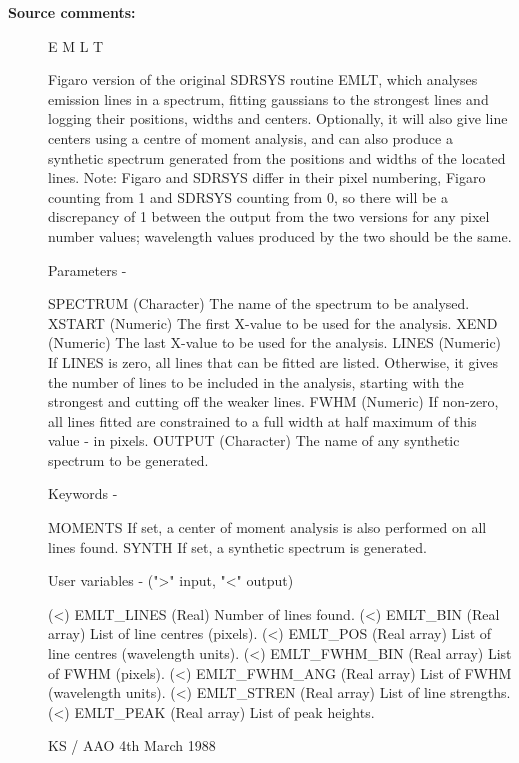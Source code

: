 \begin{description}
\begin{description}
\item [\textbf{Source comments:}]
\begin{terminalv}
 E M L T

 Figaro version of the original SDRSYS routine EMLT, which analyses
 emission lines in a spectrum, fitting gaussians to the strongest
 lines and logging their positions, widths and centers.  Optionally,
 it will also give line centers using a centre of moment analysis,
 and can also produce a synthetic spectrum generated from the
 positions and widths of the located lines.  Note: Figaro and SDRSYS
 differ in their pixel numbering, Figaro counting from 1 and SDRSYS
 counting from 0, so there will be a discrepancy of 1 between the
 output from the two versions for any pixel number values; wavelength
 values produced by the two should be the same.

 Parameters -

 SPECTRUM    (Character) The name of the spectrum to be analysed.
 XSTART      (Numeric) The first X-value to be used for the analysis.
 XEND        (Numeric) The last X-value to be used for the analysis.
 LINES       (Numeric) If LINES is zero, all lines that can be
             fitted are listed.  Otherwise, it gives the number of
             lines to be included in the analysis, starting with the
             strongest and cutting off the weaker lines.
 FWHM        (Numeric) If non-zero, all lines fitted are constrained
             to a full width at half maximum of this value - in pixels.
 OUTPUT      (Character) The name of any synthetic spectrum to be
             generated.

 Keywords -

 MOMENTS     If set, a center of moment analysis is also performed
             on all lines found.
 SYNTH       If set, a synthetic spectrum is generated.

 User variables -  (">" input, "<" output)

 (<) EMLT_LINES    (Real) Number of lines found.
 (<) EMLT_BIN      (Real array) List of line centres (pixels).
 (<) EMLT_POS      (Real array) List of line centres (wavelength units).
 (<) EMLT_FWHM_BIN (Real array) List of FWHM (pixels).
 (<) EMLT_FWHM_ANG (Real array) List of FWHM (wavelength units).
 (<) EMLT_STREN    (Real array) List of line strengths.
 (<) EMLT_PEAK     (Real array) List of peak heights.

                                              KS / AAO  4th March 1988
\end{terminalv}
\end{description}

\end{description}
